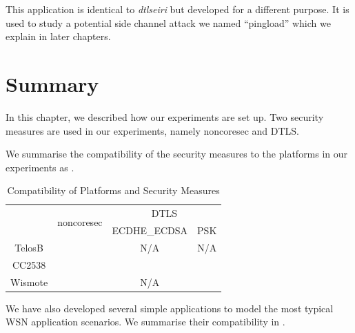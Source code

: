 \begin{description}[style=nextline]
	\item[{dtlspingload}]
	This application is identical to \textit{dtlseiri} but developed for a different purpose. It is used to study a potential side channel attack we named ``pingload'' which we explain in later chapters.
\end{description}

\section{Summary}

In this chapter, we described how our experiments are set up. Two security measures are used in our experiments, namely noncoresec and DTLS. 

We summarise the compatibility of the security measures to the platforms in our experiments as .

\begin{table}[h!]
	\center
	\begin{tabular}{|c|c|c|c|}
	\hline
	\multirow{2}{*}{} & \multirow{2}{*}{noncoresec} & \multicolumn{2}{c|}{DTLS} \\ \cline{3-4} 
	                  &                             & ECDHE\_ECDSA & PSK        \\ \hline
	TelosB            & \checkmark                  & N/A          & N/A        \\ \hline
	CC2538            & \checkmark                  & \checkmark   & \checkmark \\ \hline
	Wismote           & \checkmark                  & N/A          & \checkmark \\ \hline
	\end{tabular}
	\caption{Compatibility of Platforms and Security Measures}
	\label{Fig: Compatibility of Platforms and Security Measures}
\end{table}

We have also developed several simple applications to model the most typical WSN application scenarios. We summarise their compatibility in .

